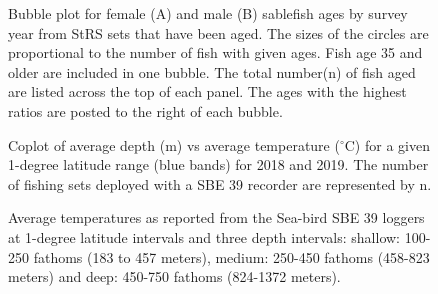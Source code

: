 \documentclass[12pt]{article}\usepackage[]{graphicx}\usepackage[]{color}
\begin{document}
\begin{figure}[htb]

{\centering {} 

}

\caption{Bubble plot for female (A) and male (B) sablefish ages by survey year from StRS sets that have been aged. The sizes of the circles are proportional to the number of fish with given ages. Fish age 35 and older are included in one bubble. The total number(n) of fish aged are listed across the top of each panel. The ages with the highest ratios are posted to the right of each bubble.}\label{fig:figure14}
\end{figure}
\clearpage


\begin{figure}[htb]

{\centering {} 

}

\caption{Coplot of average depth (m) vs average temperature (\(^\circ\)C) for a given 1-degree latitude range (blue bands) for 2018 and 2019. The number of fishing sets deployed with a SBE 39 recorder are represented by n.}\label{fig:figure15}
\end{figure}
\clearpage


\begin{figure}[htb]

{\centering {} 

}

\caption{Average temperatures as reported from the Sea-bird SBE 39 loggers at 1-degree latitude intervals and three depth intervals: shallow: 100-250 fathoms (183 to 457 meters), medium: 250-450 fathoms (458-823 meters) and deep: 450-750 fathoms (824-1372 meters).}\label{fig:figure16}
\end{figure}
\clearpage
\end{document}
